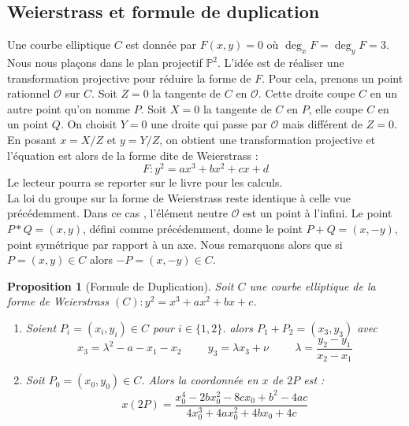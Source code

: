 \documentclass[a4paper]{article}
\newtheorem{prop}{Proposition}
\begin{document}
\newpage
\subsection{Weierstrass et formule de duplication}

Une courbe elliptique $C$ est donnée par $F(x,y)=0$ où $\deg_{x}F=\deg_{y}F=3$.
Nous nous plaçons dans le plan projectif $\mathbb{P}^2$. L'idée est de réaliser une transformation projective pour réduire la forme de $F$. Pour cela, prenons un point rationnel $\mathcal{O}$ sur $C$. Soit $Z=0$ la tangente de $C$ en $\mathcal{O}$. Cette droite coupe $C$ en un autre point qu'on nomme $P$. Soit $X=0$  la tangente de $C$ en $P$, elle coupe $C$ en un point $Q$.
On choisit $Y=0$ une droite qui passe par $\mathcal{O}$ mais différent de $Z=0$. En posant $x=X/Z$ et $y=Y/Z$, on obtient une transformation projective et l'équation est alors de la forme dite de Weierstrass :
\begin{equation*}
F: y^2=ax^3+bx^2+cx+d
\end{equation*}
Le lecteur pourra se reporter sur le livre \cite{ref2} pour les calculs. \\
La loi du groupe sur la forme de Weierstrass reste identique à celle vue précédemment. Dans ce cas , l'élément neutre $\mathcal{O}$ est un point à l'infini. Le point $P*Q=(x,y)$, défini comme précédemment, donne le point $P+Q=(x,-y)$, point symétrique par rapport à un axe.
Nous remarquons alors que si $P=(x,y) \in C$ alors $-P=(x,-y) \in C$.

\begin{prop}[Formule de Duplication] 
 Soit $C$ une courbe elliptique de la forme de Weierstrass $(C): y^2=x^3+ax^2+bx+c$.
\begin{enumerate}
\item Soient $P_{i}=(x_{i},y_{i}) \in C$ pour $i \in \{1,2\}$.
alors $P_{1}+P_{2}=(x_{3},y_{3})$ avec 
\begin{equation*}
x_{3}=\lambda^2-a-x_{1}-x_{2} \hspace{1cm} y_{3}=\lambda x_{3}+\nu
\hspace{1cm}
\lambda=\frac{y_{2}-y_{1}}{x_{2}-x_{1}}
\end{equation*}
\item Soit $P_{0}=(x_{0},y_{0}) \in C$. Alors la coordonnée en $x$ de $2P$ est :
\begin{equation*}
x(2P)=\frac{x_{0}^4-2bx_{0}^2-8cx_{0}+b^2-4ac}{4x_{0}^3+4ax_{0}^2+4bx_{0}+4c}
\end{equation*}
\end{enumerate}
\end{prop}
\end{document}
